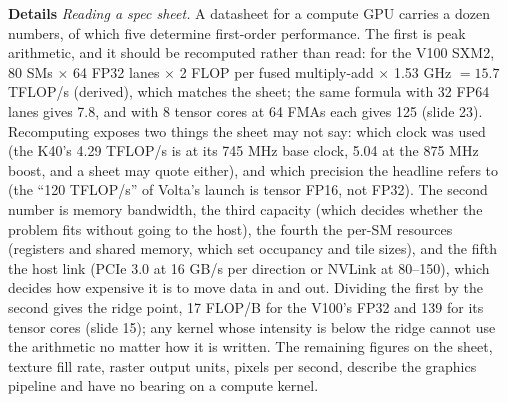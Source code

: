\documentclass[11pt,letterpaper]{article}
\newcommand{\para}[1]{\medskip\noindent\textbf{#1}\quad}
\begin{document}
\para{Details} \emph{Reading a spec sheet.} A datasheet for a compute GPU carries a dozen numbers, of which five determine first-order performance. The first is peak arithmetic, and it should be recomputed rather than read: for the V100 SXM2, 80 SMs $\times$ 64 FP32 lanes $\times$ 2 FLOP per fused multiply-add $\times$ 1.53 GHz $= 15.7$ TFLOP/s (derived), which matches the sheet; the same formula with 32 FP64 lanes gives 7.8, and with 8 tensor cores at 64 FMAs each gives 125 (slide 23). Recomputing exposes two things the sheet may not say: which clock was used (the K40's 4.29 TFLOP/s is at its 745 MHz base clock, 5.04 at the 875 MHz boost, and a sheet may quote either), and which precision the headline refers to (the ``120 TFLOP/s'' of Volta's launch is tensor FP16, not FP32). The second number is memory bandwidth, the third capacity (which decides whether the problem fits without going to the host), the fourth the per-SM resources (registers and shared memory, which set occupancy and tile sizes), and the fifth the host link (PCIe 3.0 at 16 GB/s per direction or NVLink at 80--150), which decides how expensive it is to move data in and out. Dividing the first by the second gives the ridge point, 17 FLOP/B for the V100's FP32 and 139 for its tensor cores (slide 15); any kernel whose intensity is below the ridge cannot use the arithmetic no matter how it is written. The remaining figures on the sheet, texture fill rate, raster output units, pixels per second, describe the graphics pipeline and have no bearing on a compute kernel.
\end{document}

